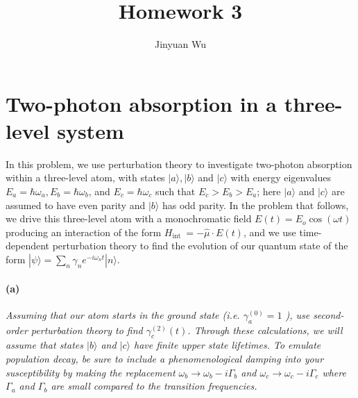 \documentclass[hyperref, a4paper]{article}
\title{Homework 3}
\author{Jinyuan Wu}
\begin{document}
\maketitle

\section{Two-photon absorption in a three-level system}

In this problem, we use perturbation theory to investigate two-photon absorption within a three-level atom, with states $|a\rangle,|b\rangle$ and $|c\rangle$ with energy eigenvalues $E_a=\hbar \omega_a, E_b=\hbar \omega_b$, and $E_c=\hbar \omega_c$ such that $E_c>E_b>E_a$; here $|a\rangle$ and $|c\rangle$ are assumed to have even parity and $|b\rangle$ has odd parity. In the problem that follows, we drive this three-level atom with a monochromatic field $E(t)=E_o \cos (\omega t)$ producing an interaction of the form $H_{\text {int }}=-\hat{\mu} \cdot E(t)$, and we use time-dependent perturbation theory to find the evolution of our quantum state of the form $|\psi\rangle=\sum_n \gamma_n e^{-i \omega_n t}|n\rangle$.

\paragraph*{(a)} \textit{
    Assuming that our atom starts in the ground state (i.e. $\gamma_a^{(0)}=1$ ), use second-order perturbation theory to find $\gamma_c^{(2)}(t)$. Through these calculations, we will assume that states $|b\rangle$ and $|c\rangle$ have finite upper state lifetimes. To emulate population decay, be sure to include a phenomenological damping into your susceptibility by making the replacement $\omega_b \rightarrow \omega_b-i \Gamma_b$ and $\omega_c \rightarrow \omega_c-i \Gamma_c$ where $\Gamma_a$ and $\Gamma_b$ are small compared to the transition frequencies.
}
\end{document}
